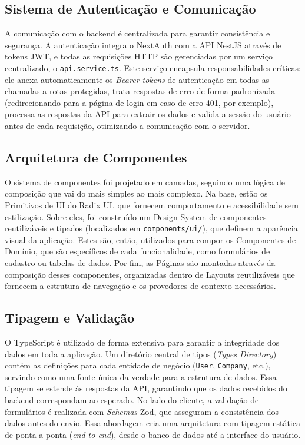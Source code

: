 \subsection{Sistema de Autenticação e Comunicação}

A comunicação com o backend é centralizada para garantir consistência e segurança. A autenticação integra o NextAuth com a API NestJS através de tokens JWT, e todas as requisições HTTP são gerenciadas por um serviço centralizado, o \texttt{api.service.ts}. Este serviço encapsula responsabilidades críticas: ele anexa automaticamente os \textit{Bearer tokens} de autenticação em todas as chamadas a rotas protegidas, trata respostas de erro de forma padronizada (redirecionando para a página de login em caso de erro 401, por exemplo), processa as respostas da API para extrair os dados e valida a sessão do usuário antes de cada requisição, otimizando a comunicação com o servidor.

\subsection{Arquitetura de Componentes}

O sistema de componentes foi projetado em camadas, seguindo uma lógica de composição que vai do mais simples ao mais complexo. Na base, estão os Primitivos de UI do Radix UI, que fornecem comportamento e acessibilidade sem estilização. Sobre eles, foi construído um Design System de componentes reutilizáveis e tipados (localizados em \texttt{components/ui/}), que definem a aparência visual da aplicação. Estes são, então, utilizados para compor os Componentes de Domínio, que são específicos de cada funcionalidade, como formulários de cadastro ou tabelas de dados. Por fim, as Páginas são montadas através da composição desses componentes, organizadas dentro de Layouts reutilizáveis que fornecem a estrutura de navegação e os provedores de contexto necessários.


\subsection{Tipagem e Validação}

O TypeScript é utilizado de forma extensiva para garantir a integridade dos dados em toda a aplicação. Um diretório central de tipos (\textit{Types Directory}) contém as definições para cada entidade de negócio (\texttt{User}, \texttt{Company}, etc.), servindo como uma fonte única da verdade para a estrutura de dados. Essa tipagem se estende às respostas da API, garantindo que os dados recebidos do backend correspondam ao esperado. No lado do cliente, a validação de formulários é realizada com \textit{Schemas} Zod, que asseguram a consistência dos dados antes do envio. Essa abordagem cria uma arquitetura com tipagem estática de ponta a ponta (\textit{end-to-end}), desde o banco de dados até a interface do usuário.

